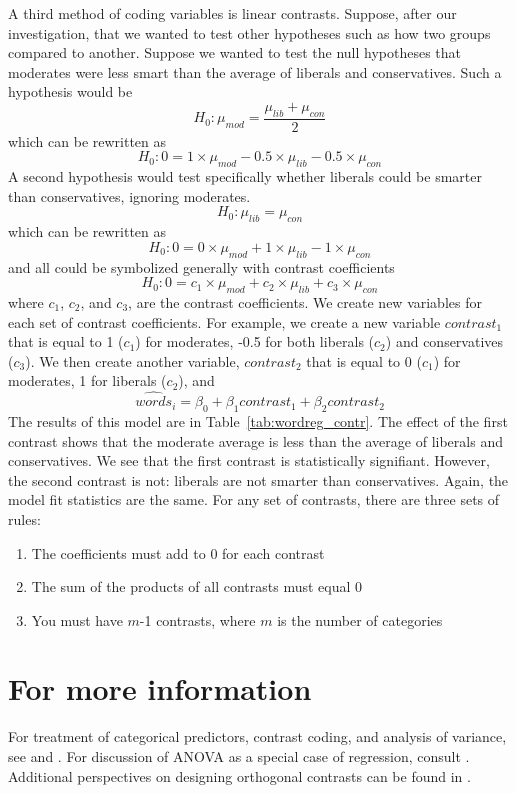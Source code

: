 A third method of coding variables is linear contrasts. Suppose, after our investigation, that we wanted to test other hypotheses such as how two groups compared to another. Suppose we wanted to test the null hypotheses that moderates were less smart than the average of liberals and conservatives. Such a hypothesis would be
\[
H_0:\mu_{mod}=\frac{\mu_{lib}+\mu_{con}}{2}
\]
which can be rewritten as
\[
H_0:0=1\times\mu_{mod}-0.5\times\mu_{lib}-0.5\times\mu_{con}
\]
A second hypothesis would test specifically whether liberals could be smarter than conservatives, ignoring moderates.
\[
H_0:\mu_{lib}=\mu_{con}
\]
which can be rewritten as
\[
H_0:0=0\times\mu_{mod}+1\times\mu_{lib}-1\times\mu_{con}
\]
and all could be symbolized generally with contrast coefficients
\[
H_0:0=c_1\times\mu_{mod}+c_2\times\mu_{lib}+c_3\times\mu_{con}
\]
where $c_1$, $c_2$, and $c_3$, are the contrast coefficients. We create new variables for each set of contrast coefficients. For example, we create a new variable $contrast_1$ that is equal to 1 ($c_1$) for moderates, -0.5 for both liberals ($c_2$) and conservatives ($c_3$). We then create another variable, $contrast_2$ that is equal to 0 ($c_1$) for moderates, 1 for liberals ($c_2$), and \[
\widehat{words}_i=\beta_0+\beta_1contrast_1+\beta_2contrast_2
\]
The results of this model are in Table~\ref{tab:wordreg_contr}. The effect of the first contrast shows that the moderate average is less than the average of liberals and conservatives. We see that the first contrast is statistically signifiant. However, the second contrast is not: liberals are not smarter than conservatives. Again, the model fit statistics are the same. For any set of contrasts, there are three sets of rules:
\begin{enumerate}
 \item The coefficients must add to 0 for each contrast
 \item The sum of the products of all contrasts must equal 0
 \item You must have $m$-1 contrasts, where $m$ is the number of categories
\end{enumerate}

\section*{For more information}
For treatment of categorical predictors, contrast coding, and analysis of variance, see \citep{fox} and \citep{agresti}. For discussion of ANOVA as a special case of regression, consult \citep{cameron2005microeconometrics}. Additional perspectives on designing orthogonal contrasts can be found in \citep{kish1965survey}.
